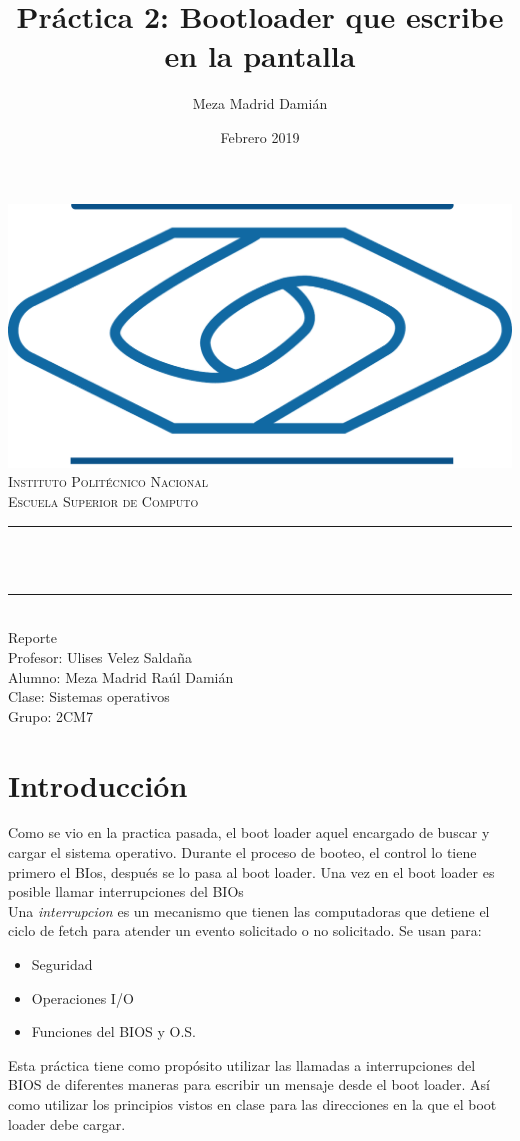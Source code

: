 \documentclass[12pt]{article}
\title{Práctica 2: Bootloader que escribe en la pantalla}%
\author{Meza Madrid Damián}%
\date{Febrero 2019}%
\makeatletter
\let\thetitle\@title
\makeatother
\begin{document}

\begin{titlepage}
	\centering
    \vspace*{0.5 cm}
    \includegraphics[scale = 0.30]{escom.png}\\[1.0 cm]	%
	\textsc{\Large Instituto Politécnico Nacional}\\[0.5 cm]%
	\textsc{\Large Escuela Superior de Computo}\\[0.5 cm]%
	\rule{\linewidth}{0.2 mm} \\[0.4 cm]
	{ \huge \bfseries \thetitle}\\
	\rule{\linewidth}{0.2 mm} \\[1.5 cm]
	Reporte\\
	Profesor: Ulises Velez Saldaña \\
	Alumno: Meza Madrid Raúl Damián\\
    Clase: Sistemas operativos\\
    Grupo: 2CM7\\
\end{titlepage}
\tableofcontents
\pagebreak
\section{Introducción}
Como se vio en la practica pasada, el boot loader aquel encargado de buscar y cargar el sistema operativo. Durante el proceso de booteo, el control lo tiene primero el BIos, después se lo pasa al boot loader. Una vez en el boot loader es posible llamar interrupciones del BIOs\\
Una \emph{interrupcion} es un mecanismo que tienen las computadoras que detiene el ciclo de fetch para atender un evento solicitado o no solicitado. Se usan para:
\begin{itemize}
    \item Seguridad
    \item Operaciones I/O
    \item Funciones del BIOS y O.S.
\end{itemize}
Esta práctica tiene como propósito utilizar las llamadas a interrupciones del BIOS de diferentes maneras para escribir un mensaje desde el boot loader. Así como utilizar los principios vistos en clase para las direcciones en la que el boot loader debe cargar.
\end{document}
